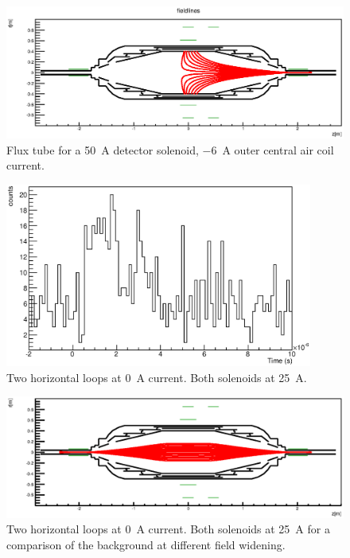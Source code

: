 \begin{figure}
\centering
	\centerline{\includegraphics[width = 1.3\linewidth]{graphics/analysis/monSpec/fieldSimulation/AD.eps} }
	
	\caption[\SI{50}{\ampere} loops]{Flux tube for a \SI{50}{\ampere} detector solenoid, \SI{-6}{\ampere} outer central air coil current.}
	\label{fig:ADf}
\end{figure}

\begin{figure}
\centering
	\includegraphics[width = 0.9\textwidth]{graphics/analysis/monSpec/AD.eps}
	\caption[\SI{50}{\ampere} loops]{Two horizontal loops at \SI{0}{\ampere} current. Both solenoids at \SI{25}{\ampere}.}
	\label{fig:AD}
\end{figure}
\clearpage









\begin{figure}
\centering
	\centerline{\includegraphics[width = 1.3\linewidth]{graphics/analysis/monSpec/fieldSimulation/NA.eps} }
	
	\caption[\SI{0}{\ampere} loops]{Two horizontal loops at \SI{0}{\ampere} current. Both solenoids at \SI{25}{\ampere} for a comparison of the background at different field widening.}
	\label{fig:NAf}
\end{figure}

